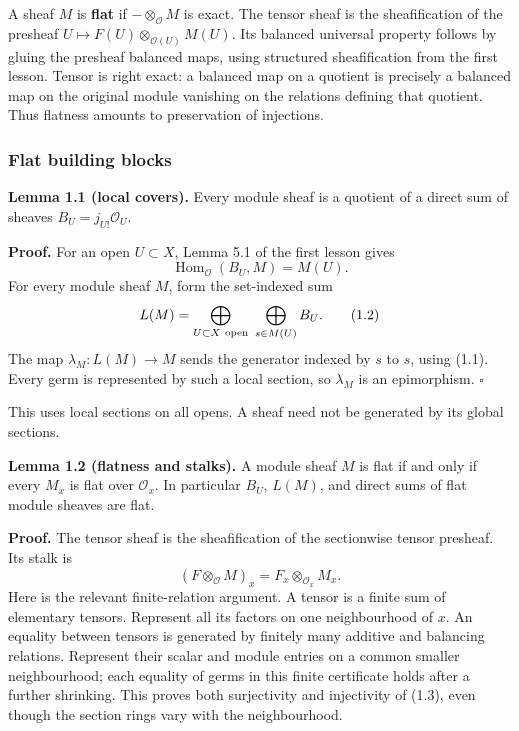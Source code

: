 \documentclass[
  english,
  11pt,
  a4paper,
]{article}
\begin{document}
A sheaf \(M\) is \textbf{flat} if \(-\otimes_{\mathcal O}M\) is exact.
The tensor sheaf is the sheafification of the presheaf
\(U\mapsto F(U)\otimes_{\mathcal O(U)}M(U)\). Its balanced universal
property follows by gluing the presheaf balanced maps, using structured
sheafification from the first lesson. Tensor is right exact: a balanced
map on a quotient is precisely a balanced map on the original module
vanishing on the relations defining that quotient. Thus flatness amounts
to preservation of injections.

\subsubsection{Flat building
blocks}\label{flat-modules-and-k-flat-resolutions--flat-building-blocks}

\textbf{Lemma 1.1 (local covers).} Every module sheaf is a quotient of a
direct sum of sheaves \(B_U=j_{U!}\mathcal O_U\).

\textbf{Proof.} For an open \(U\subset X\), Lemma 5.1 of the first
lesson gives \[\operatorname{Hom}_{\mathcal O}(B_U,M)=M(U).
\tag{1.1}\] For every module sheaf \(M\), form the set-indexed sum
\[L(M)=\bigoplus_{U\subset X\ {\rm open}}\ \bigoplus_{s\in M(U)}B_U .
\tag{1.2}\] The map \(\lambda_M:L(M)\to M\) sends the generator indexed
by \(s\) to \(s\), using (1.1). Every germ is represented by such a
local section, so \(\lambda_M\) is an epimorphism. \(\square\)

This uses local sections on all opens. A sheaf need not be generated by
its global sections.

\textbf{Lemma 1.2 (flatness and stalks).} A module sheaf \(M\) is flat
if and only if every \(M_x\) is flat over \(\mathcal O_x\). In
particular \(B_U\), \(L(M)\), and direct sums of flat module sheaves are
flat.

\textbf{Proof.} The tensor sheaf is the sheafification of the
sectionwise tensor presheaf. Its stalk is
\[(F\otimes_{\mathcal O}M)_x=F_x\otimes_{\mathcal O_x}M_x .
\tag{1.3}\] Here is the relevant finite-relation argument. A tensor is a
finite sum of elementary tensors. Represent all its factors on one
neighbourhood of \(x\). An equality between tensors is generated by
finitely many additive and balancing relations. Represent their scalar
and module entries on a common smaller neighbourhood; each equality of
germs in this finite certificate holds after a further shrinking. This
proves both surjectivity and injectivity of (1.3), even though the
section rings vary with the neighbourhood.
\end{document}

